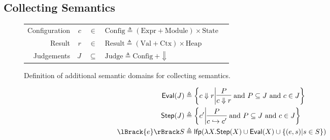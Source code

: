 \documentclass{article}
\theoremstyle{definition}
\newcommand*{\Expr}{\text{Expr}}
\newcommand*{\Module}{\text{Module}}
\newcommand*{\Ctx}{\text{Ctx}}
\newcommand*{\Value}{\text{Val}}
\newcommand*{\Mem}{\text{Heap}}
\newcommand*{\Config}{\text{Config}}
\newcommand*{\State}{\text{State}}
\newcommand*{\Result}{\text{Result}}
\newcommand*{\Judge}{\text{Judge}}
\newcommand*{\lfp}{\mathsf{lfp}}
\newcommand*{\Step}{\mathsf{Step}}
\newcommand*{\Eval}{\mathsf{Eval}}
\newcommand*{\semarrow}{\hookrightarrow}
\newcommand*{\sembracket}[1]{\lBrack{#1}\rBrack}
\begin{document}
\subsection{Collecting Semantics}
\begin{figure}[h!]
  \centering
  \begin{tabular}{rrcll}
    Configuration & $c$ & $\in$       & $\Config\triangleq(\Expr+\Module)\times\State$ \\
    Result        & $r$ & $\in$       & $\Result\triangleq(\Value+\Ctx)\times\Mem$     \\
    Judgements    & $J$ & $\subseteq$ & $\Judge\triangleq\Config\:+\Downarrow$
  \end{tabular}
  \caption{Definition of additional semantic domains for collecting semantics.}
  \label{fig:coldom}
\end{figure}
\begin{align*}
  \Eval(J)        & \triangleq
  \left\{c\Downarrow r\middle|
  \begin{prooftree}[center=true]
    \hypo{P}\infer1{c\Downarrow r}
  \end{prooftree}\text{ and }
  P\subseteq J\text{ and }c\in J
  \right\}                     \\
  \Step(J)        & \triangleq
  \left\{c'\middle|
  \begin{prooftree}[center=true]
    \hypo{P}\infer1{c\semarrow c'}
  \end{prooftree}\text{ and }
  P\subseteq J\text{ and }c\in J
  \right\}                     \\
  \sembracket{e}S & \triangleq
  \lfp(\lambda X.\Step(X)\cup\Eval(X)\cup\{(e,s)|s\in S\})
\end{align*}
\end{document}

